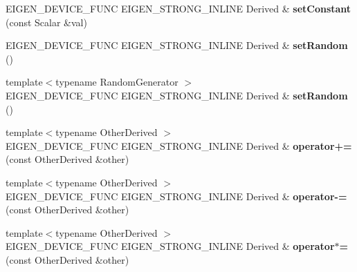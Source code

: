 \begin{DoxyCompactItemize}
E\+I\+G\+E\+N\+\_\+\+D\+E\+V\+I\+C\+E\+\_\+\+F\+U\+NC E\+I\+G\+E\+N\+\_\+\+S\+T\+R\+O\+N\+G\+\_\+\+I\+N\+L\+I\+NE Derived \& {\bfseries set\+Constant} (const Scalar \&val)
\item 
\mbox{\label{class_eigen_1_1_tensor_base_a2ac4183b51dfe9eb60be6c9a8230486c}} 
E\+I\+G\+E\+N\+\_\+\+D\+E\+V\+I\+C\+E\+\_\+\+F\+U\+NC E\+I\+G\+E\+N\+\_\+\+S\+T\+R\+O\+N\+G\+\_\+\+I\+N\+L\+I\+NE Derived \& {\bfseries set\+Random} ()
\item 
\mbox{\label{class_eigen_1_1_tensor_base_a92314eb2b5a6930ea8647bee0bcb2ee3}} 
{\footnotesize template$<$typename Random\+Generator $>$ }\\E\+I\+G\+E\+N\+\_\+\+D\+E\+V\+I\+C\+E\+\_\+\+F\+U\+NC E\+I\+G\+E\+N\+\_\+\+S\+T\+R\+O\+N\+G\+\_\+\+I\+N\+L\+I\+NE Derived \& {\bfseries set\+Random} ()
\item 
\mbox{\label{class_eigen_1_1_tensor_base_ae4d3345a004772e2dbae575f98cdfe68}} 
{\footnotesize template$<$typename Other\+Derived $>$ }\\E\+I\+G\+E\+N\+\_\+\+D\+E\+V\+I\+C\+E\+\_\+\+F\+U\+NC E\+I\+G\+E\+N\+\_\+\+S\+T\+R\+O\+N\+G\+\_\+\+I\+N\+L\+I\+NE Derived \& {\bfseries operator+=} (const Other\+Derived \&other)
\item 
\mbox{\label{class_eigen_1_1_tensor_base_aa20d4f30a69bc63b26941e625a9ca922}} 
{\footnotesize template$<$typename Other\+Derived $>$ }\\E\+I\+G\+E\+N\+\_\+\+D\+E\+V\+I\+C\+E\+\_\+\+F\+U\+NC E\+I\+G\+E\+N\+\_\+\+S\+T\+R\+O\+N\+G\+\_\+\+I\+N\+L\+I\+NE Derived \& {\bfseries operator-\/=} (const Other\+Derived \&other)
\item 
\mbox{\label{class_eigen_1_1_tensor_base_a70d9db7dffed7f8c05919bae69de68f5}} 
{\footnotesize template$<$typename Other\+Derived $>$ }\\E\+I\+G\+E\+N\+\_\+\+D\+E\+V\+I\+C\+E\+\_\+\+F\+U\+NC E\+I\+G\+E\+N\+\_\+\+S\+T\+R\+O\+N\+G\+\_\+\+I\+N\+L\+I\+NE Derived \& {\bfseries operator$\ast$=} (const Other\+Derived \&other)
\item 
\mbox{\label{class_eigen_1_1_tensor_base_af0d8227d12e52a815e1a2e14ee6b8835}} 

\end{DoxyCompactItemize}
